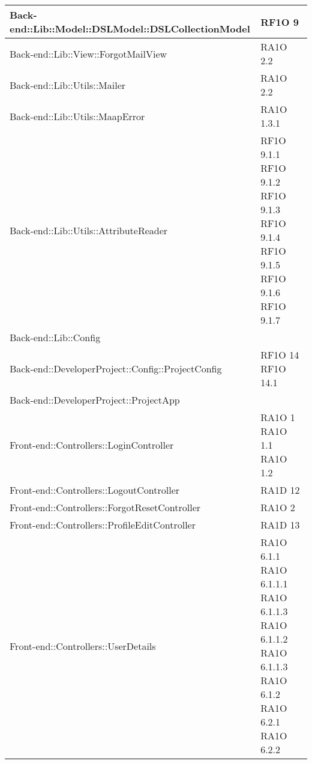 \begin{center}
\begin{longtable}{ | p{11cm} | p{3cm} | }
	Back-end::Lib::Model::DSLModel::DSLCollectionModel & RF1O 9 \\ \hline
	
	Back-end::Lib::View::ForgotMailView & RA1O 2.2 \\ \hline
	
	Back-end::Lib::Utils::Mailer & RA1O 2.2 \\ \hline
	
	Back-end::Lib::Utils::MaapError & RA1O 1.3.1 \\ \hline
	
	Back-end::Lib::Utils::AttributeReader & RF1O 9.1.1 \newline RF1O 9.1.2 \newline RF1O 9.1.3 \newline RF1O 9.1.4 \newline 
										RF1O 9.1.5 \newline RF1O 9.1.6 \newline RF1O 9.1.7 \\ \hline

	Back-end::Lib::Config & \\ \hline
	
	Back-end::DeveloperProject::Config::ProjectConfig & RF1O 14 \newline RF1O 14.1 \\ \hline
	
	Back-end::DeveloperProject::ProjectApp & \\ \hline
	
	Front-end::Controllers::LoginController & RA1O 1 \newline RA1O 1.1 \newline RA1O 1.2 \\ \hline
	
	Front-end::Controllers::LogoutController & RA1D 12 \\ \hline
	
	Front-end::Controllers::ForgotResetController & RA1O 2 \\ \hline
	
	Front-end::Controllers::ProfileEditController & RA1D 13 \\ \hline
	
	Front-end::Controllers::UserDetails & RA1O 6.1.1 \newline RA1O 6.1.1.1 \newline RA1O 6.1.1.3 \newline 
	RA1O 6.1.1.2 \newline RA1O 6.1.1.3 \newline RA1O 6.1.2 \newline RA1O 6.2.1 \newline RA1O 6.2.2 \\ \hline
	

\end{longtable}
\end{center}
